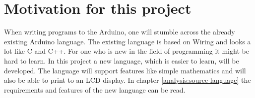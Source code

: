 \section{Motivation for this project}\label{introduction:motivation}
When writing programs to the Arduino, one will stumble across the already existing Arduino language. The existing language is based on Wiring and looks a lot like C and C++. For one who is new in the field of programming it might be hard to learn. In this project a new language, which is easier to learn, will be developed. The language will support features like simple mathematics and will also be able to print to an LCD display. In chapter \ref{analysis:source-language} the requirements and features of the new language can be read.


